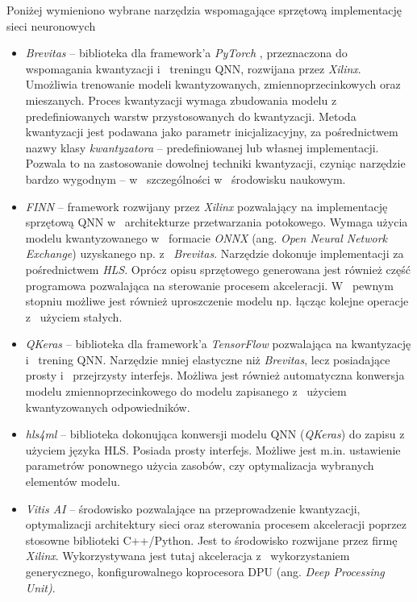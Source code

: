 Poniżej wymieniono wybrane narzędzia wspomagające sprzętową implementację sieci neuronowych
\begin{itemize}
    \item \emph{Brevitas}\cite{brevitas} -- biblioteka dla framework'a \emph{PyTorch} \cite{pytorch}, przeznaczona do wspomagania kwantyzacji i~ treningu QNN, rozwijana przez \emph{Xilinx}. Umożliwia trenowanie modeli kwantyzowanych, zmiennoprzecinkowych oraz mieszanych. Proces kwantyzacji wymaga zbudowania modelu z~ predefiniowanych warstw przystosowanych do kwantyzacji. 
    Metoda kwantyzacji jest podawana jako parametr inicjalizacyjny, za pośrednictwem nazwy klasy \emph{kwantyzatora} -- predefiniowanej lub własnej implementacji. 
    Pozwala to na zastosowanie dowolnej techniki kwantyzacji, czyniąc narzędzie bardzo wygodnym -- w~ szczególności w~ środowisku naukowym.
    
    \item \emph{FINN}\cite{finn} -- framework rozwijany przez \emph{Xilinx} pozwalający na implementację sprzętową QNN w~ architekturze przetwarzania potokowego. 
    Wymaga użycia modelu kwantyzowanego w~ formacie \emph{ONNX} (ang. \emph{Open Neural Network Exchange}) uzyskanego np. z~ \emph{Brevitas}.
    Narzędzie dokonuje implementacji za pośrednictwem \emph{HLS}. Oprócz opisu sprzętowego generowana jest również część programowa pozwalająca na sterowanie procesem akceleracji. 
    W~ pewnym stopniu możliwe jest również uproszczenie modelu np. łącząc kolejne operacje z~ użyciem stałych. 
    
    
    \item \emph{QKeras}\cite{qkeras} -- biblioteka dla framework'a \emph{TensorFlow}\cite{tf} pozwalająca na kwantyzację i~ trening QNN. Narzędzie mniej elastyczne niż \emph{Brevitas}, lecz posiadające prosty i~ przejrzysty interfejs. 
    Możliwa jest również automatyczna konwersja modelu zmiennoprzecinkowego do modelu zapisanego z~ użyciem kwantyzowanych odpowiedników.
    
    \item \emph{hls4ml}\cite{hls4ml} -- biblioteka dokonująca konwersji modelu QNN (\emph{QKeras}) do zapisu z~ użyciem języka HLS.
    Posiada prosty interfejs. 
    Możliwe jest m.in. ustawienie parametrów ponownego użycia zasobów, czy optymalizacja wybranych elementów modelu. 
    
    \item \emph{Vitis AI}\cite{vitis_ai} -- środowisko pozwalające na przeprowadzenie kwantyzacji, optymalizacji architektury sieci oraz sterowania procesem akceleracji poprzez stosowne biblioteki C++/Python. Jest to środowisko rozwijane przez firmę \emph{Xilinx}.
    Wykorzystywana jest tutaj akceleracja z~ wykorzystaniem generycznego, konfigurowalnego koprocesora DPU (ang.\textit{ Deep Processing Unit)}. 
    
\end{itemize}


